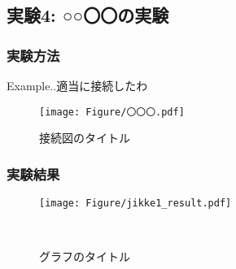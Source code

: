 \subsection{実験4: ○○〇〇の実験}
  \subsubsection{実験方法}
  Example..適当に接続したわ

    \begin{figure}[htbp]
    \centering
    \texttt{[image: Figure/〇〇〇.pdf]}
    \caption{接続図のタイトル}
    \end{figure}

  

  \clearpage
  \subsubsection{実験結果}
  

  
  \begin{figure}[htbp]
    \centering
    \texttt{[image: Figure/jikke1\_result.pdf]}
    \caption{グラフのタイトル}
　\end{figure}


\clearpage